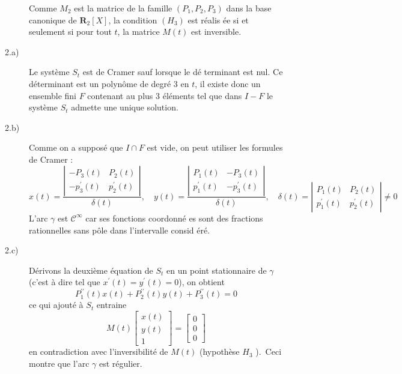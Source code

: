 \begin{description}
\begin{description}
Comme $M_{2}$ est la matrice de la famille $(P_{1},P_{2},P_{3})$ dans la
base canonique de $\mathbf{R}_{2}[X]$, la condition $(H_{3})$ est r\'{e}alis%
\'{e}e si et seulement si pour tout $t$, la matrice $M(t)$ est inversible.

\item[2.a)]  Le syst\`{e}me $S_{t}$ est de Cramer sauf lorsque le d\'{e}%
terminant est nul. Ce d\'{e}terminant est un polyn\^{o}me de degr\'{e} 3 en $%
t$, il existe donc un ensemble fini $F$ contenant au plus 3 \'{e}l\'{e}ments
tel que dans $I-F$ le syst\`{e}me $S_{t}$ admette une unique solution.

\item[2.b)]  Comme on a suppos\'{e} que $I\cap F$ est vide, on peut utiliser
les formules de Cramer :
\[
x(t)=\frac{\left| 
\begin{array}{cc}
-P_{3}(t) & P_{2}(t) \\ 
-p_{3}^{\prime }(t) & p_{2}^{\prime }(t)
\end{array}
\right| }{\delta (t)},\quad y(t)=\frac{\left| 
\begin{array}{cc}
P_{1}(t) & -P_{3}(t) \\ 
p_{1}^{\prime }(t) & -p_{3}^{\prime }(t)
\end{array}
\right| }{\delta (t)},\quad \delta (t)=\left| 
\begin{array}{cc}
P_{1}(t) & P_{2}(t) \\ 
p_{1}^{\prime }(t) & p_{2}^{\prime }(t)
\end{array}
\right| \neq 0
\]
L'arc $\gamma $ est $\mathcal{C}^{\infty }$ car ses fonctions coordonn\'{e}%
es sont des fractions rationnelles sans p\^{o}le dans l'intervalle consid%
\'{e}r\'{e}.

\item[2.c)]  D\'{e}rivons la deuxi\`{e}me \'{e}quation de $S_{t}$ en un
point stationnaire de $\gamma $ (c'est \`{a} dire tel que $x^{\prime
}(t)=y^{\prime }(t)=0$), on obtient 
\[
P_{1}^{\prime \prime }(t)x(t)+P_{2}^{\prime \prime }(t)y(t)+P_{3}^{\prime
\prime }(t)=0
\]
ce qui ajout\'{e} \`{a} $S_{t}$ entraine 
\[
M(t)\left[ 
\begin{array}{c}
x(t) \\ 
y(t) \\ 
1
\end{array}
\right] =\left[ 
\begin{array}{c}
0 \\ 
0 \\ 
0
\end{array}
\right] 
\]
en contradiction avec l'inversibilit\'{e} de $M(t)$ (hypoth\`{e}se $H_{3}$%
).\ Ceci montre que l'arc $\gamma $ est r\'{e}gulier.


\end{description}
\end{description}
